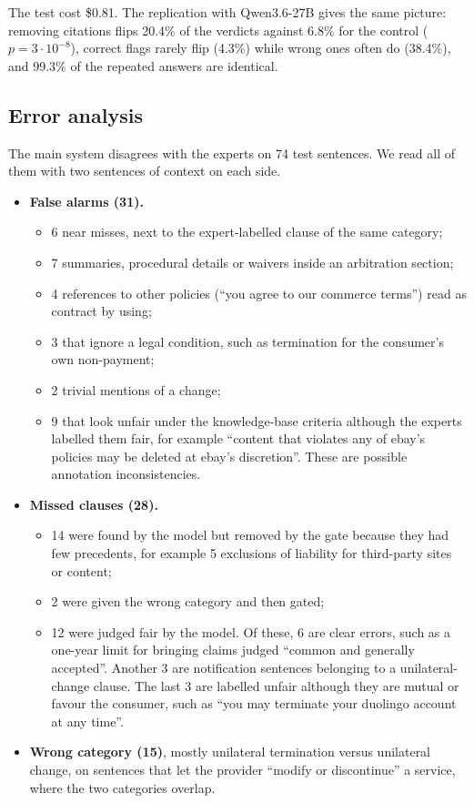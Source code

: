 The test cost \$0.81. The replication with Qwen3.6-27B gives the same picture: removing citations flips 20.4\% of the verdicts against 6.8\% for the control ($p = 3\cdot10^{-8}$), correct flags rarely flip (4.3\%) while wrong ones often do (38.4\%), and 99.3\% of the repeated answers are identical.

\subsection{Error analysis}

The main system disagrees with the experts on 74 test sentences. We read all of them with two sentences of context on each side.
\begin{itemize}
  \item \textbf{False alarms (31).}
    \begin{itemize}
      \item 6 near misses, next to the expert-labelled clause of the same category;
      \item 7 summaries, procedural details or waivers inside an arbitration section;
      \item 4 references to other policies (``you agree to our commerce terms'') read as contract by using;
      \item 3 that ignore a legal condition, such as termination for the consumer's own non-payment;
      \item 2 trivial mentions of a change;
      \item 9 that look unfair under the knowledge-base criteria although the experts labelled them fair, for example ``content that violates any of ebay's policies may be deleted at ebay's discretion''. These are possible annotation inconsistencies.
    \end{itemize}
  \item \textbf{Missed clauses (28).}
    \begin{itemize}
      \item 14 were found by the model but removed by the gate because they had few precedents, for example 5 exclusions of liability for third-party sites or content;
      \item 2 were given the wrong category and then gated;
      \item 12 were judged fair by the model. Of these, 6 are clear errors, such as a one-year limit for bringing claims judged ``common and generally accepted''. Another 3 are notification sentences belonging to a unilateral-change clause. The last 3 are labelled unfair although they are mutual or favour the consumer, such as ``you may terminate your duolingo account at any time''.
    \end{itemize}
  \item \textbf{Wrong category (15)}, mostly unilateral termination versus unilateral change, on sentences that let the provider ``modify or discontinue'' a service, where the two categories overlap.
\end{itemize}

